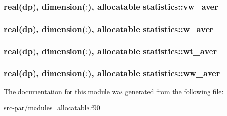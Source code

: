 \hypertarget{classstatistics_aa69a50e52610d5da19a676feade82aaf}{
\subsubsection[{vw\-\_\-aver}]{\setlength{\rightskip}{0pt plus 5cm}real(dp), dimension(\-:), allocatable statistics\-::vw\-\_\-aver}}\label{classstatistics_aa69a50e52610d5da19a676feade82aaf}
\hypertarget{classstatistics_a15ade1ebbda9ffbf25b906dec9f667fc}{
\subsubsection[{w\-\_\-aver}]{\setlength{\rightskip}{0pt plus 5cm}real(dp), dimension(\-:), allocatable statistics\-::w\-\_\-aver}}\label{classstatistics_a15ade1ebbda9ffbf25b906dec9f667fc}
\hypertarget{classstatistics_aaee710726ddb4e229fff6b5565760bad}{
\subsubsection[{wt\-\_\-aver}]{\setlength{\rightskip}{0pt plus 5cm}real(dp), dimension(\-:), allocatable statistics\-::wt\-\_\-aver}}\label{classstatistics_aaee710726ddb4e229fff6b5565760bad}
\hypertarget{classstatistics_a75fda978d2762d39c1c197b1d63bf786}{
\subsubsection[{ww\-\_\-aver}]{\setlength{\rightskip}{0pt plus 5cm}real(dp), dimension(\-:), allocatable statistics\-::ww\-\_\-aver}}\label{classstatistics_a75fda978d2762d39c1c197b1d63bf786}


The documentation for this module was generated from the following file\-:\begin{DoxyCompactItemize}
\item 
src-\/par/\hyperlink{modules__allocatable_8f90}{modules\-\_\-allocatable.\-f90}\end{DoxyCompactItemize}
